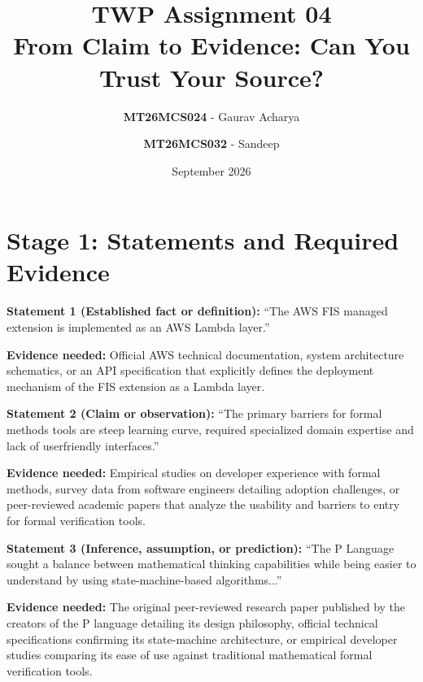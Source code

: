\documentclass{article}
\title{
    TWP Assignment 04
    \\ From Claim to Evidence: Can You Trust Your Source?
}
\author{
    \textbf{MT26MCS024} - Gaurav Acharya\and \textbf{MT26MCS032} - Sandeep
}
\date{September 2026}
\begin{document}
\maketitle


\section*{Stage 1: Statements and Required Evidence}

\noindent\textbf{Statement 1 (Established fact or definition):} ``The AWS FIS managed extension is implemented as an AWS Lambda layer.''

\vspace{0.5em}
\noindent\textbf{Evidence needed:} Official AWS technical documentation, system architecture schematics, or an API specification that explicitly defines the deployment mechanism of the FIS extension as a Lambda layer.

\vspace{1.5em}

\noindent\textbf{Statement 2 (Claim or observation):} ``The primary barriers for formal methods tools are steep learning curve, required specialized domain expertise and lack of userfriendly interfaces.''

\vspace{0.5em}
\noindent\textbf{Evidence needed:} Empirical studies on developer experience with formal methods, survey data from software engineers detailing adoption challenges, or peer-reviewed academic papers that analyze the usability and barriers to entry for formal verification tools.

\vspace{1.5em}

\noindent\textbf{Statement 3 (Inference, assumption, or prediction):} ``The P Language sought a balance between mathematical thinking capabilities while being easier to understand by using state-machine-based algorithms...''

\vspace{0.5em}
\noindent\textbf{Evidence needed:} The original peer-reviewed research paper published by the creators of the P language detailing its design philosophy, official technical specifications confirming its state-machine architecture, or empirical developer studies comparing its ease of use against traditional mathematical formal verification tools.

\end{document}
